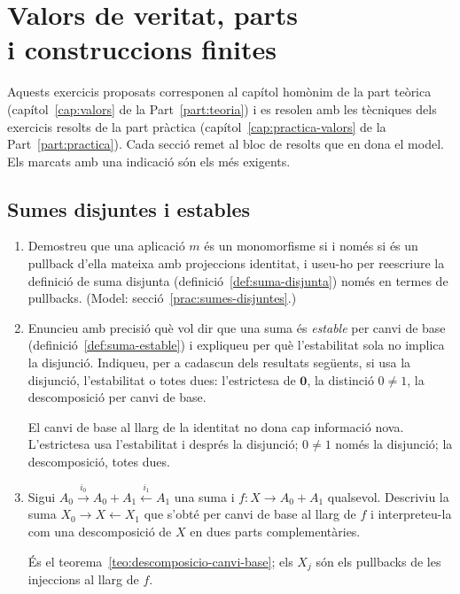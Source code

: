 \chapter[Valors de veritat i construccions finites]{Valors de veritat, parts\texorpdfstring{\\}{ }i construccions finites}\label{cap:exercicis-valors}

Aquests exercicis proposats corresponen al capítol homònim de la part teòrica (capítol~\ref{cap:valors} de la Part~\ref{part:teoria}) i es resolen amb les tècniques dels exercicis resolts de la part pràctica (capítol~\ref{cap:practica-valors} de la Part~\ref{part:practica}). Cada secció remet al bloc de resolts que en dona el model. Els marcats amb una indicació són els més exigents.

\section{Sumes disjuntes i estables}

\begin{enumerate}
  \item Demostreu que una aplicació \(m\) és un monomorfisme si i només si és un pullback d'ella mateixa amb projeccions identitat, i useu-ho per reescriure la definició de suma disjunta (definició~\ref{def:suma-disjunta}) només en termes de pullbacks. (Model: secció~\ref{prac:sumes-disjuntes}.)

  \item Enuncieu amb precisió què vol dir que una suma és \emph{estable} per canvi de base (definició~\ref{def:suma-estable}) i expliqueu per què l'estabilitat sola no implica la disjunció. Indiqueu, per a cadascun dels resultats següents, si usa la disjunció, l'estabilitat o totes dues: l'estrictesa de \(\mathbf0\), la distinció \(0\ne1\), la descomposició per canvi de base. \begin{indicacio}El canvi de base al llarg de la identitat no dona cap informació nova. L'estrictesa usa l'estabilitat i després la disjunció; \(0\ne1\) només la disjunció; la descomposició, totes dues.\end{indicacio}

  \item Sigui \(A_0\xrightarrow{i_0}A_0+A_1\xleftarrow{i_1}A_1\) una suma i \(f:X\to A_0+A_1\) qualsevol. Descriviu la suma \(X_0\to X\leftarrow X_1\) que s'obté per canvi de base al llarg de \(f\) i interpreteu-la com una descomposició de \(X\) en dues parts complementàries. \begin{indicacio}És el teorema~\ref{teo:descomposicio-canvi-base}; els \(X_j\) són els pullbacks de les injeccions al llarg de \(f\).\end{indicacio}
\end{enumerate}

